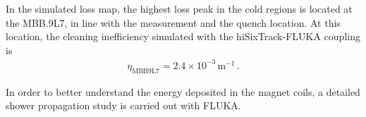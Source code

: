 



In the simulated loss map, the highest loss peak in the cold regions is located at the MBB.9L7, in line with the measurement and the quench location. At this location, the cleaning inefficiency simulated with the hiSixTrack-FLUKA coupling is 
\begin{align}
\eta_\text{MBB9L7} = 2.4 \times 10^{-3}\, \text{m}^{-1} \, .
\end{align}

In order to better understand the energy deposited in the magnet coils, a detailed shower propagation study is carried out with FLUKA.



